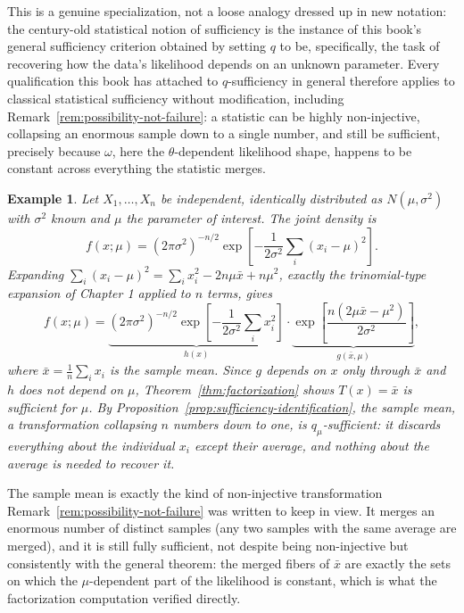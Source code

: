 \documentclass[11pt]{book}
\newtheorem{example}[theorem]{Example}
\begin{document}
This is a genuine specialization, not a loose analogy dressed up in new notation: the century-old statistical notion of sufficiency is the instance of this book's general sufficiency criterion obtained by setting $q$ to be, specifically, the task of recovering how the data's likelihood depends on an unknown parameter. Every qualification this book has attached to $q$-sufficiency in general therefore applies to classical statistical sufficiency without modification, including Remark~\ref{rem:possibility-not-failure}: a statistic can be highly non-injective, collapsing an enormous sample down to a single number, and still be sufficient, precisely because $\omega$, here the $\theta$-dependent likelihood shape, happens to be constant across everything the statistic merges.

\begin{example}
\label{ex:gaussian-mean}
Let $X_1,\ldots,X_n$ be independent, identically distributed as $N(\mu,\sigma^2)$ with $\sigma^2$ known and $\mu$ the parameter of interest. The joint density is
\[
f(x;\mu) = (2\pi\sigma^2)^{-n/2}\exp\!\left[-\frac{1}{2\sigma^2}\sum_i(x_i-\mu)^2\right].
\]
Expanding $\sum_i(x_i-\mu)^2 = \sum_i x_i^2 - 2n\mu\bar x + n\mu^2$, exactly the trinomial-type expansion of Chapter 1 applied to $n$ terms, gives
\[
f(x;\mu) = \underbrace{(2\pi\sigma^2)^{-n/2}\exp\!\left[-\frac{1}{2\sigma^2}\sum_i x_i^2\right]}_{h(x)} \cdot \underbrace{\exp\!\left[\frac{n(2\mu\bar x - \mu^2)}{2\sigma^2}\right]}_{g(\bar x,\mu)},
\]
where $\bar x = \tfrac1n\sum_i x_i$ is the sample mean. Since $g$ depends on $x$ only through $\bar x$ and $h$ does not depend on $\mu$, Theorem~\ref{thm:factorization} shows $T(x)=\bar x$ is sufficient for $\mu$. By Proposition~\ref{prop:sufficiency-identification}, the sample mean, a transformation collapsing $n$ numbers down to one, is $q_\mu$-sufficient: it discards everything about the individual $x_i$ except their average, and nothing about the average is needed to recover it.
\end{example}

The sample mean is exactly the kind of non-injective transformation Remark~\ref{rem:possibility-not-failure} was written to keep in view. It merges an enormous number of distinct samples (any two samples with the same average are merged), and it is still fully sufficient, not despite being non-injective but consistently with the general theorem: the merged fibers of $\bar x$ are exactly the sets on which the $\mu$-dependent part of the likelihood is constant, which is what the factorization computation verified directly.
\end{document}
